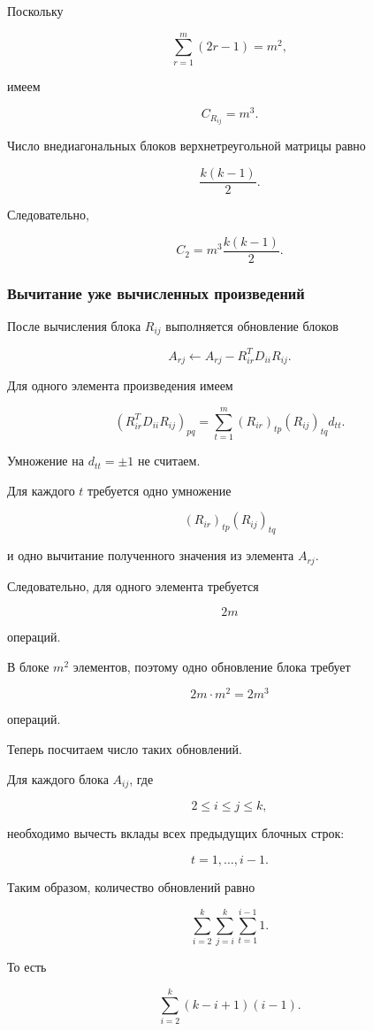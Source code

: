 \documentclass[a4paper,12pt]{article}
\begin{document}
Поскольку

$$
\sum_{r=1}^{m}(2r-1)=m^2,
$$

имеем

$$
C_{R_{ij}}=m^3.
$$

Число внедиагональных блоков верхнетреугольной матрицы равно

$$
\frac{k(k-1)}{2}.
$$

Следовательно,

$$
C_2
=
m^3\frac{k(k-1)}{2}.
$$

\subsubsection{Вычитание уже вычисленных произведений}

После вычисления блока \(R_{ij}\) выполняется обновление блоков

$$
A_{rj}
\leftarrow
A_{rj}
-
R_{ir}^{T}D_{ii}R_{ij}.
$$

Для одного элемента произведения имеем

$$
(R_{ir}^{T}D_{ii}R_{ij})_{pq}
=
\sum_{t=1}^{m}
(R_{ir})_{tp}(R_{ij})_{tq}d_{tt}.
$$

Умножение на \(d_{tt}=\pm1\) не считаем.

Для каждого \(t\) требуется одно умножение

$$
(R_{ir})_{tp}(R_{ij})_{tq}
$$

и одно вычитание полученного значения из элемента \(A_{rj}\).

Следовательно, для одного элемента требуется

$$
2m
$$

операций.

В блоке \(m^2\) элементов, поэтому одно обновление блока требует

$$
2m\cdot m^2=2m^3
$$

операций.

Теперь посчитаем число таких обновлений.

Для каждого блока \(A_{ij}\), где

$$
2\le i\le j\le k,
$$

необходимо вычесть вклады всех предыдущих блочных строк:

$$
t=1,\ldots,i-1.
$$

Таким образом, количество обновлений равно

$$
\sum_{i=2}^{k}
\sum_{j=i}^{k}
\sum_{t=1}^{i-1}1.
$$

То есть

$$
\sum_{i=2}^{k}(k-i+1)(i-1).
$$
\end{document}
